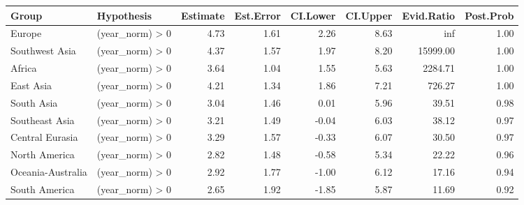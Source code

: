 \begin{tabular}{llrrrrrr}
\toprule
Group & Hypothesis & Estimate & Est.Error & CI.Lower & CI.Upper & Evid.Ratio & Post.Prob \\
\midrule
Europe & (year_norm) > 0 & 4.73 & 1.61 & 2.26 & 8.63 & inf & 1.00 \\
Southwest Asia & (year_norm) > 0 & 4.37 & 1.57 & 1.97 & 8.20 & 15999.00 & 1.00 \\
Africa & (year_norm) > 0 & 3.64 & 1.04 & 1.55 & 5.63 & 2284.71 & 1.00 \\
East Asia & (year_norm) > 0 & 4.21 & 1.34 & 1.86 & 7.21 & 726.27 & 1.00 \\
South Asia & (year_norm) > 0 & 3.04 & 1.46 & 0.01 & 5.96 & 39.51 & 0.98 \\
Southeast Asia & (year_norm) > 0 & 3.21 & 1.49 & -0.04 & 6.03 & 38.12 & 0.97 \\
Central Eurasia & (year_norm) > 0 & 3.29 & 1.57 & -0.33 & 6.07 & 30.50 & 0.97 \\
North America & (year_norm) > 0 & 2.82 & 1.48 & -0.58 & 5.34 & 22.22 & 0.96 \\
Oceania-Australia & (year_norm) > 0 & 2.92 & 1.77 & -1.00 & 6.12 & 17.16 & 0.94 \\
South America & (year_norm) > 0 & 2.65 & 1.92 & -1.85 & 5.87 & 11.69 & 0.92 \\
\bottomrule
\end{tabular}
